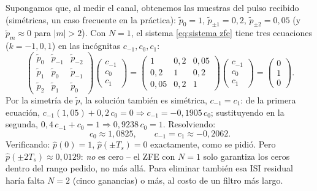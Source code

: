 \begin{ejemplo}[ZFE de tres ganancias, $N=1$]\label{ejemplo:zfe n1}
Supongamos que, al medir el canal, obtenemos las muestras del pulso recibido (simétricas, un caso frecuente en la práctica): $\tilde p_0=1$, $\tilde p_{\pm 1}=0{,}2$, $\tilde p_{\pm 2}=0{,}05$ (y $\tilde p_m\approx 0$ para $|m|>2$). Con $N=1$, el sistema \eqref{eq:sistema zfe} tiene tres ecuaciones ($k=-1,0,1$) en las incógnitas $c_{-1},c_0,c_1$:
\begin{equation*}
    \begin{pmatrix} \tilde p_0 & \tilde p_{-1} & \tilde p_{-2} \\ \tilde p_1 & \tilde p_0 & \tilde p_{-1} \\ \tilde p_2 & \tilde p_1 & \tilde p_0 \end{pmatrix}
    \begin{pmatrix} c_{-1} \\ c_0 \\ c_1 \end{pmatrix}
    =
    \begin{pmatrix} 1 & 0{,}2 & 0{,}05 \\ 0{,}2 & 1 & 0{,}2 \\ 0{,}05 & 0{,}2 & 1 \end{pmatrix}
    \begin{pmatrix} c_{-1} \\ c_0 \\ c_1 \end{pmatrix}
    =
    \begin{pmatrix} 0 \\ 1 \\ 0 \end{pmatrix}.
\end{equation*}
Por la simetría de $\tilde p$, la solución también es simétrica, $c_{-1}=c_1$: de la primera ecuación, $c_{-1}(1{,}05) + 0{,}2\, c_0 = 0 \Rightarrow c_{-1}=-0{,}1905\, c_0$; sustituyendo en la segunda, $0{,}4\,c_{-1}+c_0=1 \Rightarrow 0{,}9238\, c_0 = 1$. Resolviendo:
\begin{equation*}
    c_0 \approx 1{,}0825, \qquad c_{-1}=c_1\approx -0{,}2062.
\end{equation*}
Verificando: $\hat p(0)=1$, $\hat p(\pm T_s)=0$ exactamente, como se pidió. Pero $\hat p(\pm 2T_s)\approx 0{,}0129$: \emph{no} es cero -- el ZFE con $N=1$ solo garantiza los ceros dentro del rango pedido, no más allá. Para eliminar también esa ISI residual haría falta $N=2$ (cinco ganancias) o más, al costo de un filtro más largo.
\end{ejemplo}

